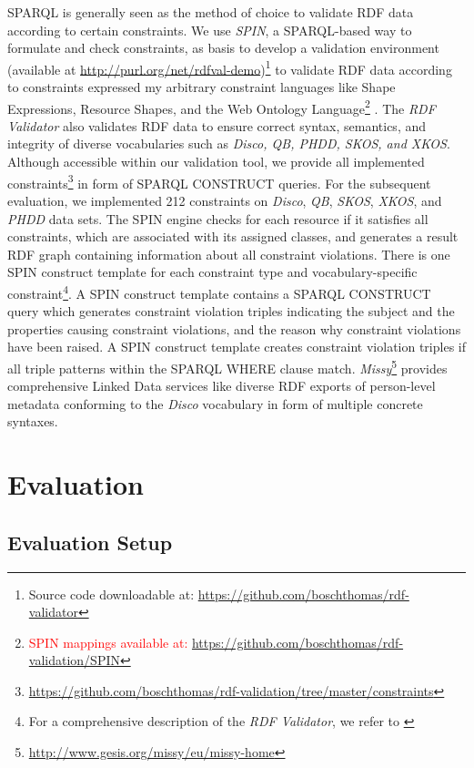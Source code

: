\documentclass{llncs}
\begin{document}
{{SPARQL is generally seen as the method of choice to validate RDF data according to certain constraints.
We use \emph{SPIN}, 
a SPARQL-based way to formulate and check constraints, as basis to develop a
validation environment (available at \url{http://purl.org/net/rdfval-demo})\footnote{Source code downloadable at: \textcolor{red}{\url{https://github.com/boschthomas/rdf-validator}}} to validate RDF data according to constraints expressed my arbitrary constraint languages like Shape Expressions,
Resource Shapes, and the Web Ontology Language\footnote{\textcolor{red}{SPIN mappings available at: \url{https://github.com/boschthomas/rdf-validation/SPIN}}} \cite{BoschEckert2014-2}.
The \emph{RDF Validator} also validates RDF data to ensure correct syntax, semantics, and integrity of diverse vocabularies such as \emph{Disco, QB, PHDD, SKOS, and XKOS}.
Although accessible within our validation tool, we provide all implemented constraints\footnote{\url{https://github.com/boschthomas/rdf-validation/tree/master/constraints}} in form of SPARQL CONSTRUCT queries.
For the subsequent evaluation, we implemented 212 constraints on \emph{Disco}, \emph{QB}, \emph{SKOS}, \emph{XKOS}, and \emph{PHDD} data sets.
The SPIN engine checks for each resource if it satisfies all constraints, which are associated with its assigned classes, and generates a result RDF graph containing information about all constraint violations.
There is one SPIN construct template for each constraint type and vocabulary-specific constraint\footnote{For a comprehensive description of the \emph{RDF Validator}, we refer to \cite{BoschEckert2014-2}}.
A SPIN construct template contains a SPARQL CONSTRUCT query which generates constraint violation triples indicating the subject and the properties causing constraint violations, and the reason why constraint violations have been raised.
A SPIN construct template creates constraint violation triples if all triple patterns within the SPARQL WHERE clause match.
\emph{Missy}\footnote{\url{http://www.gesis.org/missy/eu/missy-home}} provides comprehensive Linked Data services like diverse RDF exports of person-level metadata conforming to the \emph{Disco} vocabulary in form of multiple concrete syntaxes. 

\section{Evaluation}
\label{evaluation}

\subsection{Evaluation Setup}

}}
\end{document}
